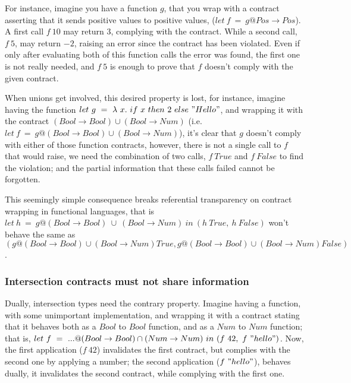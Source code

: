 For instance, imagine you have a function $g$, that
you wrap with a contract asserting that it sends positive values to positive values,
($let~f~=~g@Pos \rightarrow Pos$).
A first call $f~10$ may return $3$, complying with the contract.
While a second call, $f~5$, may return $-2$, raising an error since
the contract has been violated.
Even if only after evaluating both of this function calls
the error was found, the first one is not really needed, and $f~5$ is enough to
prove that $f$ doesn't comply with the given contract.

When unions get involved, this desired property is lost,
for instance, imagine having the function $let~g~=~\lambda~x.~if~x~then~2~else~"Hello"$,
and wrapping it with the contract $(Bool \rightarrow Bool) \cup (Bool \rightarrow Num)$
(i.e. $let~f~=~g@(Bool \rightarrow Bool) \cup (Bool \rightarrow Num)$),
it's clear that $g$ doesn't comply with either of those function contracts, however, there
is not a single call to $f$ that would raise, we need the combination of two calls,
$f~True$ and $f~False$ to find the violation; and the partial
information that these calls failed cannot be forgotten.


This seemingly simple consequence breaks referential transparency on
contract wrapping in functional languages, that is
$let~h~=~g@(Bool \rightarrow Bool)~\cup~(Bool \rightarrow Num)~in~(h~True,~h~False)$
won't behave the same as 
$(g@(Bool \rightarrow Bool) \cup (Bool \rightarrow Num) True, g@(Bool \rightarrow Bool) \cup (Bool \rightarrow Num) False)$.


\subsubsection*{Intersection contracts must not share information}

Dually, intersection types need the contrary property.
Imagine having a function, with some unimportant implementation,
and wrapping it
with a contract stating that it behaves both as a $Bool$ to $Bool$ function,
and as a $Num$ to $Num$ function; that is, 
$let~f~=~...@(Bool \rightarrow Bool) \cap (Num \rightarrow Num)~in~(f~42,~f~"hello")$.
Now, the first application ($f~42$) invalidates the first contract, but complies with the second
one by applying a number; the second application ($f~"hello"$), behaves dually,
it invalidates the second contract,
while complying with the first one.

